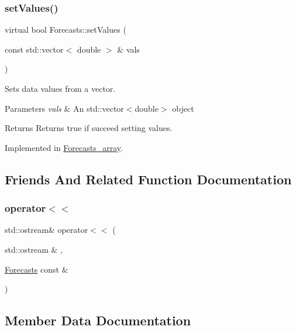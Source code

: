 \subsubsection{\texorpdfstring{set\+Values()}{setValues()}}
{\footnotesize\ttfamily virtual bool Forecasts\+::set\+Values (\begin{DoxyParamCaption}\item[{const std\+::vector$<$ double $>$ \&}]{vals }\end{DoxyParamCaption})\hspace{0.3cm}{\ttfamily [pure virtual]}}

Sets data values from a vector.


\begin{DoxyParams}{Parameters}
{\em vals} & An std\+::vector$<$double$>$ object \\
\hline
\end{DoxyParams}
\begin{DoxyReturn}{Returns}
Returns true if succeed setting values. 
\end{DoxyReturn}


Implemented in \mbox{\hyperlink{class_forecasts__array_aba3f3632244ddb18c0b8a3fa0ee86981}{Forecasts\+\_\+array}}.



\subsection{Friends And Related Function Documentation}
\mbox{\label{class_forecasts_a42c14120042eae287169092654f5b6c8}} 
\subsubsection{\texorpdfstring{operator$<$$<$}{operator<<}}
{\footnotesize\ttfamily std\+::ostream\& operator$<$$<$ (\begin{DoxyParamCaption}\item[{std\+::ostream \&}]{,  }\item[{\mbox{\hyperlink{class_forecasts}{Forecasts}} const \&}]{ }\end{DoxyParamCaption})\hspace{0.3cm}{\ttfamily [friend]}}



\subsection{Member Data Documentation}
\mbox{\label{class_forecasts_a5bbcb6eb5d291718f8f91e576827518b}} 
